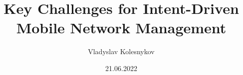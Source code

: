 \def\languages{main=english}


\title{Key Challenges for Intent-Driven Mobile Network Management}

\author{Vladyslav Kolesnykov}

\date{21.06.2022}



